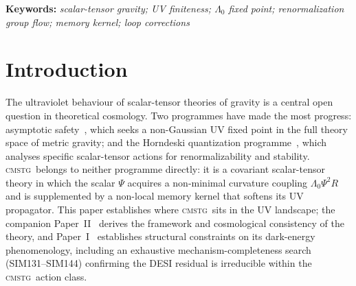 \documentclass[12pt,a4paper]{article}
\newcommand{\CMSTG}{\textsc{cmstg}}
\newcommand{\Lz}{{\Lambda_0}}
\newcommand{\Mpl}{M_{\rm Pl}}
\newcommand{\km}{{k_m}}
\newcommand{\keywords}[1]{\par\noindent\textbf{Keywords:} \textit{#1}\par\bigskip}
\begin{document}
\begin{abstract}
propagator, and the finiteness of $dI/dp^2|_0$ in $d=4$. The graviton
wavefunction renormalization $\Delta Z_h/Z_h \approx 1.4\times10^{-6}$ is
negligible.
These results establish that \CMSTG\ is UV-finite to two loops in the resummed
propagator, with an explicit RG trajectory connecting the observed
$\Lz_{\rm obs} = 0.003\,\Mpl^{-2}$ to the GR fixed point. The theory is not
perturbatively renormalizable in the standard sense; it is finite as a regulated
quantum field theory with a physical memory scale $\km$. This is made explicit
throughout, and is contrasted with asymptotic safety and the Horndeski
quantization programme in Section~\ref{sec:comparison}.
Companion papers establish (I)~the no-go theorems and their exhaustive
mechanism-completeness proofs (SIM131--SIM144)~\cite{WilsonPaperI},
(II)~the framework and observational consistency~\cite{WilsonPaperII}, and
(IV)~galactic-scale constraints~\cite{WilsonPaperIV}.
\end{abstract}

\keywords{scalar-tensor gravity; UV finiteness; $\Lz$ fixed point; renormalization group flow; memory kernel; loop corrections}

\tableofcontents
\bigskip

\section{Introduction}
\label{sec:intro}

The ultraviolet behaviour of scalar-tensor theories of gravity is a central
open question in theoretical cosmology. Two programmes have made the most
progress: asymptotic safety~\cite{Reuter1998,Reuter2012,Percacci2007}, which
seeks a non-Gaussian UV fixed point in the full theory space of metric gravity;
and the Horndeski quantization programme~\cite{Horndeski1974,deRham2011,Gleyzes2015},
which analyses specific scalar-tensor actions for renormalizability and stability.
\CMSTG\ belongs to neither programme directly: it is a covariant scalar-tensor
theory in which the scalar $\Psi$ acquires a non-minimal curvature coupling
$\Lz\Psi^2 R$ and is supplemented by a non-local memory kernel that softens its
UV propagator. This paper establishes where \CMSTG\ sits in the UV landscape; the
companion Paper~II~\cite{WilsonPaperII} derives the framework and cosmological
consistency of the theory, and Paper~I~\cite{WilsonPaperI} establishes structural
constraints on its dark-energy phenomenology, including an exhaustive
mechanism-completeness search (SIM131--SIM144) confirming the DESI
residual is irreducible within the \CMSTG\ action class.
\end{document}
